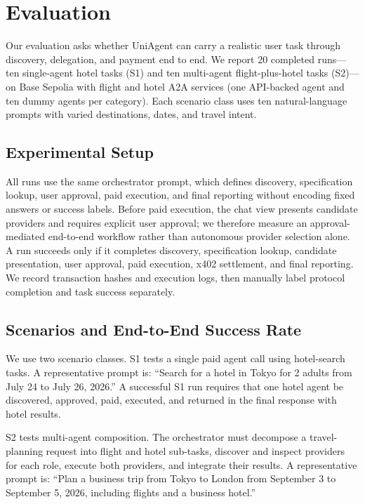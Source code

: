 \documentclass[sigconf]{acmart}
\begin{document}
\section{Evaluation}
\label{sec:evaluation}

Our evaluation asks whether UniAgent can carry a realistic user task
through discovery, delegation, and payment end to end. We report 20
completed runs---ten single-agent hotel tasks (S1) and ten multi-agent
flight-plus-hotel tasks (S2)---on Base Sepolia with flight and hotel A2A
services (one API-backed agent and ten dummy agents per category). Each
scenario class uses ten natural-language prompts with varied destinations,
dates, and travel intent.

\subsection{Experimental Setup}
All runs use the same orchestrator prompt, which defines discovery,
specification lookup, user approval, paid execution, and final reporting
without encoding fixed answers or success labels. Before paid execution,
the chat view presents candidate providers and requires explicit user
approval; we therefore measure an approval-mediated end-to-end workflow
rather than autonomous provider selection alone. A run succeeds only if it
completes discovery, specification lookup, candidate presentation, user
approval, paid execution, x402 settlement, and final reporting. We record
transaction hashes and execution logs, then manually label protocol
completion and task success separately.

\subsection{Scenarios and End-to-End Success Rate}
We use two scenario classes. S1 tests a single paid agent call using
hotel-search tasks. A representative prompt is: ``Search for a hotel in
Tokyo for 2 adults from July 24 to July 26, 2026.'' A successful S1 run
requires that one hotel agent be discovered, approved, paid, executed,
and returned in the final response with hotel results.

S2 tests multi-agent composition. The orchestrator must decompose a
travel-planning request into flight and hotel sub-tasks, discover and
inspect providers for each role, execute both providers, and integrate
their results. A representative prompt is: ``Plan a business trip from
Tokyo to London from September 3 to September 5, 2026, including
flights and a business hotel.''
\end{document}
